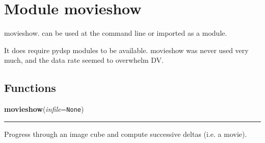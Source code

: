 %
%
%


\section{Module movieshow}

    \label{movieshow}
movieshow. can be used at the command line or imported as a module.

It does require pydsp modules to be available. movieshow was never used 
very much, and the data rate seemed to overwhelm DV.



  \subsection{Functions}

    \label{movieshow:movieshow}

    \vspace{0.5ex}

    \begin{boxedminipage}{\textwidth}

    \raggedright \textbf{movieshow}(\textit{infile}=\texttt{None})

    \vspace{-1.5ex}

    \rule{\textwidth}{0.5\fboxrule}
    Progress through an image cube and compute successive deltas (i.e. a 
    movie).

    \vspace{1ex}

    \end{boxedminipage}



